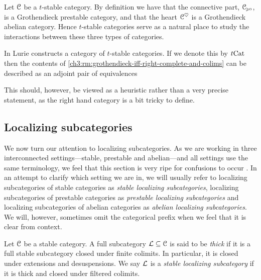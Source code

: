 \begin{remark}
    Let $\EuScript{C}$ be a $t$-stable category. By definition we have that the connective part, $\EuScript{C}_{\hspace{-1pt}\scriptscriptstyle\geqslant 0}$, is a Grothendieck prestable category, and that the heart $\EuScript{C}^\heartsuit$ is a Grothendieck abelian category. Hence $t$-stable categories serve as a natural place to study the interactions between these three types of categories. 
\end{remark}

\begin{remark}
    In \cite[Section C.3.1]{lurie_SAG} Lurie constructs a category of $t$-stable categories. If we denote this by $t\mathrm{Cat}$ then the contents of \cref{ch3:rm:grothendieck-iff-right-complete-and-colims} can be described as an adjoint pair of equivalences
    \begin{center}
    \end{center}
    This should, however, be viewed as a heuristic rather than a very precise statement, as the right hand category is a bit tricky to define. 
\end{remark}







\subsection{Localizing subcategories}
\label{ch3:ssec:localizing-subcategories}

We now turn our attention to localizing subcategories. As we are working in three interconnected settings---stable, prestable and abelian---and all settings use the same terminology, we feel that this section is very ripe for confusions to occur . In an attempt to clarify which setting we are in, we will usually refer to localizing subcategories of stable categories as \emph{stable localizing subcategories}, localizing subcategories of prestable categories as \emph{prestable localizing subcategories} and localizing subcategories of abelian categories as \emph{abelian localizing subcategories}. We will, however, sometimes omit the categorical prefix when we feel that it is clear from context. 

\begin{definition}
    Let $\EuScript{C}$ be a stable category. A full subcategory $\mathcal{L}\subseteq \EuScript{C}$ is said to be \emph{thick} if it is a full stable subcategory closed under finite colimits. In particular, it is closed under extensions and desuspensions. We say $\mathcal{L}$ is a \emph{stable localizing subcategory} if it is thick and closed under filtered colimits. 
\end{definition}

